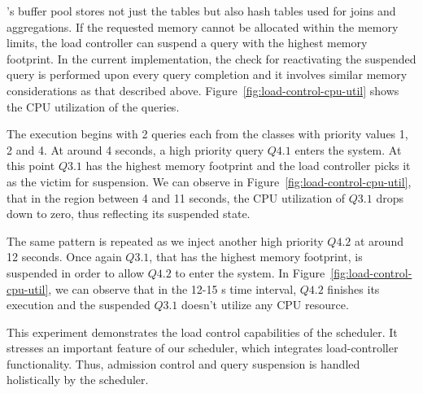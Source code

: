 \sys{}'s buffer pool stores not just the tables but also hash tables used for joins and aggregations.
If the requested memory cannot be allocated within the memory limits, the load controller can suspend a query with the highest memory footprint. 
In the current implementation, the check for reactivating the suspended query is performed upon every query completion and it involves similar memory considerations as that described above. 
Figure~\ref{fig:load-control-cpu-util} shows the CPU utilization of the queries.

The execution begins with 2 queries each from the classes with priority values 1, 2 and 4.
At around 4 seconds, a high priority query $Q4.1$ enters the system.
At this point $Q3.1$ has the highest memory footprint and the load controller
picks it as the victim for suspension.
We can observe in Figure~\ref{fig:load-control-cpu-util}, that in the region between 4
and 11 seconds, the CPU utilization of $Q3.1$ drops down to zero, thus
reflecting its suspended state.

The same pattern is repeated as we inject another high priority $Q4.2$ at around 12 seconds.
Once again $Q3.1$, that has the highest memory footprint, is suspended in order to allow $Q4.2$ to enter the system. 
In Figure~\ref{fig:load-control-cpu-util}, we can observe that in the 12-15 s time interval, $Q4.2$ finishes its execution and the suspended $Q3.1$ doesn't utilize any CPU resource.

This experiment demonstrates the load control capabilities of the \sys{}
scheduler. 
It stresses an important feature of our scheduler, which integrates load-controller functionality. %
Thus, admission control and query suspension is handled holistically by the scheduler. 